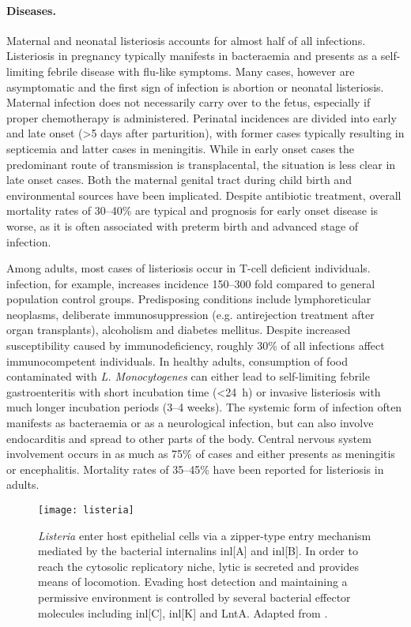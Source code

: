 \paragraph{Diseases.}
Maternal and neonatal listeriosis accounts for almost half of all infections. Listeriosis in pregnancy typically manifests in bacteraemia and presents as a self-limiting febrile disease with flu-like symptoms. Many cases, however are asymptomatic and the first sign of infection is abortion or neonatal listeriosis. Maternal infection does not necessarily carry over to the fetus, especially if proper chemotherapy is administered. Perinatal incidences are divided into early and late onset (\textgreater 5 days after parturition), with former cases typically resulting in septicemia and latter cases in meningitis. While in early onset cases the predominant route of transmission is transplacental, the situation is less clear in late onset cases. Both the maternal genital tract during child birth and environmental sources have been implicated. Despite antibiotic treatment, overall mortality rates of 30--40\% are typical and prognosis for early onset disease is worse, as it is often associated with preterm birth and advanced stage of infection. 

Among adults, most cases of listeriosis occur in T-cell deficient individuals.  infection, for example, increases incidence 150--300 fold compared to general population control groups. Predisposing conditions include lymphoreticular neoplasms, deliberate immunosuppression (e.g. antirejection treatment after organ transplants), alcoholism and diabetes mellitus. Despite increased susceptibility caused by immunodeficiency, roughly 30\% of all infections affect immunocompetent individuals. In healthy adults, consumption of food contaminated with \textit{L. Monocytogenes} can either lead to self-limiting febrile gastroenteritis with short incubation time (\textless \SI{24}{\hour}) or invasive listeriosis with much longer incubation periods (3--4 weeks). The systemic form of infection often manifests as bacteraemia or as a neurological infection, but can also involve endocarditis and spread to other parts of the body. Central nervous system involvement occurs in as much as 75\% of cases and either presents as meningitis or encephalitis. Mortality rates of 35--45\% have been reported for listeriosis in adults.

\begin{figure}
  \centering
  \texttt{[image: listeria]}
  \caption[A selection of features relevant for infection of epithelial cells by \textit{Listeria}.]{\textit{Listeria} enter host epithelial cells via a zipper-type entry mechanism mediated by the bacterial internalins \acrshort{inl}[A] and \acrshort{inl}[B]. In order to reach the cytosolic replicatory niche, lytic  is secreted and  provides means of locomotion. Evading host detection and maintaining a permissive environment is controlled by several bacterial effector molecules including \acrshort{inl}[C], \acrshort{inl}[K] and LntA. Adapted from \citep{Cossart2014}.}
  \label{fig:listeria}
\end{figure}


